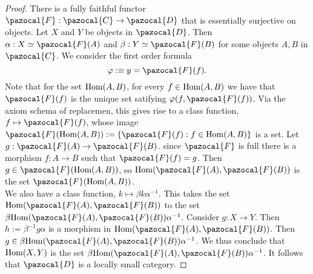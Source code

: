     \begin{proof}
        There is a fully faithful functor $\pazocal{F}:\pazocal{C}\rightarrow \pazocal{D}$ that is essentially surjective on objects. Let $X$ and $Y$ be objects in $\pazocal{D}$. Then $\alpha: X\simeq \pazocal{F}(A)$ and $\beta: Y\simeq \pazocal{F}(B)$ for some objects $A,B$ in $\pazocal{C}$. We consider the first order formula 
        $$\varphi :\equiv y = \pazocal{F}(f).$$
        Note that for the set $\mathrm{Hom}(A,B)$, for every $f\in \mathrm{Hom}(A,B)$ we have that $\pazocal{F}(f)$ is the unique set satifying $\varphi(f,\pazocal{F}(f))$. Via the axiom schema of replacemen, this gives rise to a class function, $f\mapsto \pazocal{F}(f)$, whose image $\pazocal{F}(\Hom(A,B)):= \{ \pazocal{F}(f): f\in \Hom(A,B)\}$ is a set. Let $g: \pazocal{F}(A)\rightarrow \pazocal{F}(B)$. since $\pazocal{F}$ is full there is a morphism $f: A\rightarrow B$ such that $\pazocal{F}(f)=g$. Then $g\in \pazocal{F}(\Hom(A,B))$, so $\Hom(\pazocal{F}(A),\pazocal{F}(B))$ is the set $\pazocal{F}(\Hom(A,B))$.\\
        We also have a class function, $k\mapsto \beta k\alpha^{-1}$. This takes the set $\Hom(\pazocal{F}(A),\pazocal{F}(B))$ to the set $\beta\Hom(\pazocal{F}(A),\pazocal{F}(B))\alpha^{-1}$. Consider $g: X\rightarrow Y$. Then $h := \beta^{-1}g\alpha$ is a morphism in $\Hom(\pazocal{F}(A),\pazocal{F}(B))$. Then $g\in \beta \Hom(\pazocal{F}(A),\pazocal{F}(B))\alpha^{-1}$. We thus conclude that $\mathrm{Hom}(X,Y)$ is the set $\beta \Hom(\pazocal{F}(A),\pazocal{F}(B))\alpha^{-1}$. It follows that $\pazocal{D}$ is a locally small category. 
    \end{proof}
